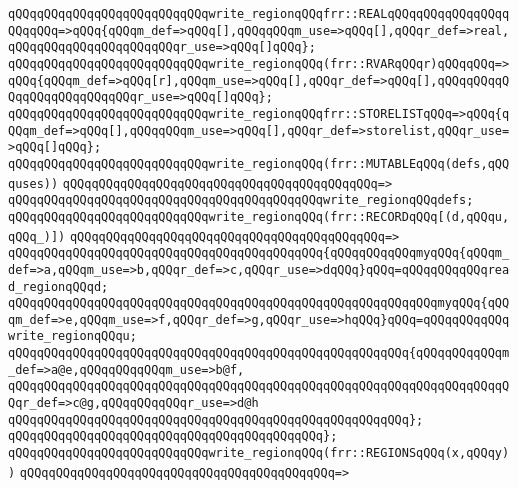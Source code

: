 \verb|qQQqqQQqqQQqqQQqqQQqqQQqqQQqwrite_regionqQQqfrr::REALqQQqqQQqqQQqqQQqqQQqqQQq=>qQQq{qQQqm_def=>qQQq[],qQQqqQQqm_use=>qQQq[],qQQqr_def=>real,qQQqqQQqqQQqqQQqqQQqqQQqr_use=>qQQq[]qQQq};|\newline
\verb|qQQqqQQqqQQqqQQqqQQqqQQqqQQqwrite_regionqQQq(frr::RVARqQQqr)qQQqqQQq=>qQQq{qQQqm_def=>qQQq[r],qQQqm_use=>qQQq[],qQQqr_def=>qQQq[],qQQqqQQqqQQqqQQqqQQqqQQqqQQqr_use=>qQQq[]qQQq};|\newline
\verb|qQQqqQQqqQQqqQQqqQQqqQQqqQQqwrite_regionqQQqfrr::STORELISTqQQq=>qQQq{qQQqm_def=>qQQq[],qQQqqQQqm_use=>qQQq[],qQQqr_def=>storelist,qQQqr_use=>qQQq[]qQQq};|\newline
\newline
\verb|qQQqqQQqqQQqqQQqqQQqqQQqqQQqwrite_regionqQQq(frr::MUTABLEqQQq(defs,qQQquses))|\newline
\verb|qQQqqQQqqQQqqQQqqQQqqQQqqQQqqQQqqQQqqQQqqQQq=>|\newline
\verb|qQQqqQQqqQQqqQQqqQQqqQQqqQQqqQQqqQQqqQQqqQQqwrite_regionqQQqdefs;|\newline
\newline
\verb|qQQqqQQqqQQqqQQqqQQqqQQqqQQqwrite_regionqQQq(frr::RECORDqQQq[(d,qQQqu,qQQq_)])|\newline
\verb|qQQqqQQqqQQqqQQqqQQqqQQqqQQqqQQqqQQqqQQqqQQq=>|\newline
\verb|qQQqqQQqqQQqqQQqqQQqqQQqqQQqqQQqqQQqqQQqqQQq{qQQqqQQqqQQqmyqQQq{qQQqm_def=>a,qQQqm_use=>b,qQQqr_def=>c,qQQqr_use=>dqQQq}qQQq=qQQqqQQqqQQqread_regionqQQqd;|\newline
\verb|qQQqqQQqqQQqqQQqqQQqqQQqqQQqqQQqqQQqqQQqqQQqqQQqqQQqqQQqqQQqmyqQQq{qQQqm_def=>e,qQQqm_use=>f,qQQqr_def=>g,qQQqr_use=>hqQQq}qQQq=qQQqqQQqqQQqwrite_regionqQQqu;|\newline
\newline
\verb|qQQqqQQqqQQqqQQqqQQqqQQqqQQqqQQqqQQqqQQqqQQqqQQqqQQqqQQq{qQQqqQQqqQQqm_def=>a@e,qQQqqQQqqQQqm_use=>b@f,|\newline
\verb|qQQqqQQqqQQqqQQqqQQqqQQqqQQqqQQqqQQqqQQqqQQqqQQqqQQqqQQqqQQqqQQqqQQqqQQqr_def=>c@g,qQQqqQQqqQQqr_use=>d@h|\newline
\verb|qQQqqQQqqQQqqQQqqQQqqQQqqQQqqQQqqQQqqQQqqQQqqQQqqQQqqQQq};|\newline
\verb|qQQqqQQqqQQqqQQqqQQqqQQqqQQqqQQqqQQqqQQqqQQq};|\newline
\newline
\verb|qQQqqQQqqQQqqQQqqQQqqQQqqQQqwrite_regionqQQq(frr::REGIONSqQQq(x,qQQqy))|\newline
\verb|qQQqqQQqqQQqqQQqqQQqqQQqqQQqqQQqqQQqqQQqqQQq=>|\newline
